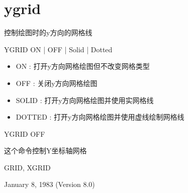 \section{ygrid}
\label{cmd:ygrid}

控制绘图时的y方向的网格线

YGRID ON | OFF | Solid | Dotted

\begin{itemize}
\item ON : 打开y方向网格绘图但不改变网格类型 
\item OFF : 关闭y方向网格绘图 
\item SOLID : 打开y方向网格绘图并使用实网格线 
\item DOTTED : 打开y方向网格绘图并使用虚线绘制网格线 
\end{itemize}

YGRID OFF

这个命令控制Y坐标轴网格

GRID, XGRID

January 8, 1983 (Version 8.0)

